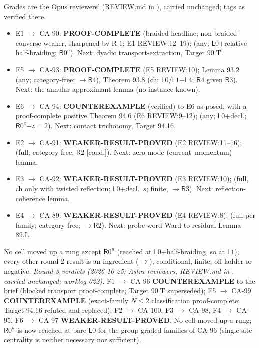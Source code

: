 Grades are the Opus reviewers' (REVIEW.md in ), carried unchanged; tags as verified there.
\begin{itemize}\itemsep0pt
\item E1 \(\to\) CA-90: \textbf{PROOF-COMPLETE} (braided headline; non-braided converse weaker, sharpened by R-1; E1 REVIEW:12--19); (any; \(\mathsf L0\)+relative half-braiding; \(\mathsf R0^u\)).  Next: dyadic transport-extraction, Target 90.T.
\item E5 \(\to\) CA-93: \textbf{PROOF-COMPLETE} (E5 REVIEW:10); Lemma 93.2 (any; category-free; \(\to\mathsf R4\)), Theorem 93.8 (ch; \(\mathsf L0\)/\(\mathsf L1\)+\(\mathsf L4\); \(\mathsf R4\) given \(\mathsf R3\)).  Next: the annular approximant lemma (no instance known).
\item E6 \(\to\) CA-94: \textbf{COUNTEREXAMPLE} (verified) to E6 as posed, with a proof-complete positive Theorem 94.6 (E6 REVIEW:9--12); (any; \(\mathsf L0\)+decl.; \(\mathsf R0^c\)+\(z{=}2\)).  Next: contact trichotomy, Target 94.16.
\item E2 \(\to\) CA-91: \textbf{WEAKER-RESULT-PROVED} (E2 REVIEW:11--16); (full; category-free; \(\mathsf R2\) [cond.]). Next: zero-mode (current--momentum) lemma.
\item E3 \(\to\) CA-92: \textbf{WEAKER-RESULT-PROVED} (E3 REVIEW:10); (full, ch only with twisted reflection; \(\mathsf L0\)+decl.\ \(s\); finite, \(\to\mathsf R3\)).  Next: reflection-coherence lemma.
\item E4 \(\to\) CA-89: \textbf{WEAKER-RESULT-PROVED} (E4 REVIEW:8); (full per family; category-free; \(\to\mathsf R2\)). Next: probe-word Ward-to-residual Lemma 89.L.
\end{itemize}
No cell moved up a rung except \(\mathsf R0^u\) (reached at \(\mathsf L0\)+half-braiding, so at \(\mathsf L1\)); every other
round-2 result is an ingredient (\(\to\)), conditional, finite, off-ladder or negative.
\emph{Round-3 verdicts (2026-10-25; Astra reviewers, REVIEW.md in , carried unchanged; worklog 022).}
F1 \(\to\) CA-96 \textbf{COUNTEREXAMPLE} to the brief (blocked transport proof-complete; Target 90.T superseded); F5 \(\to\) CA-99 \textbf{COUNTEREXAMPLE} (exact-family \(N\le2\) classification proof-complete; Target 94.16 refuted and replaced);
F2 \(\to\) CA-100, F3 \(\to\) CA-98, F4 \(\to\) CA-95, F6 \(\to\) CA-97 \textbf{WEAKER-RESULT-PROVED}. No cell moved up a rung; \(\mathsf R0^u\) is now reached at bare \(\mathsf L0\) for the group-graded families of CA-96 (single-site centrality is neither necessary nor sufficient).

